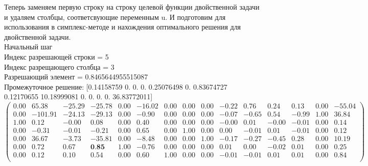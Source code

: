 \documentclass[draft]{article}
\begin{document}
\begin{flushleft}
Теперь заменяем первую строку на строку целевой функции двойственной задачи и удаляем столбцы, соответсвующие переменным u. И подготовим для использования в симплекс-методе и нахождения оптимального решения для двойственной задачи.\\

Начальный шаг\\
Индекс разрешающей строки = 5\\
Индекс разрещающего столбца = 3\\
Разрешающий элемент = 0.8465644955515087\\
Промежуточное решение:
[0.14158759  0.  0.  0.  0.25076498  0.  0.83674727  0.12170655  10.18999081  0.  0.  0.  0.  36.83772011]
\begin{equation*}
\begin{pmatrix}
    0.00 &   65.38 & -25.29 & -25.78 & 0.00 & -16.02 & 0.00 & 0.00 & 0.00 & -0.22 &  0.76 &  0.24 &  0.13 & 0.00 & -55.04 \\
    0.00 & -101.91 & -24.13 & -29.13 & 0.00 &  -0.90 & 0.00 & 0.00 & 0.00 & -0.07 & -0.65 &  0.54 & -0.99 & 1.00 &  36.84 \\
    1.00 &    0.12 &  -0.00 &   0.08 & 0.00 &   0.40 & 0.00 & 0.00 & 0.00 & -0.00 &  0.01 & -0.00 & -0.01 & 0.00 &   0.14 \\
    0.00 &   -0.31 &  -0.01 &  -0.21 & 0.00 &   0.65 & 0.00 & 1.00 & 0.00 &  0.00 & -0.01 &  0.01 & -0.01 & 0.00 &   0.12 \\
    0.00 &   36.67 &  -3.73 & -35.81 & 0.00 &  -8.48 & 0.00 & 0.00 & 1.00 & -0.17 & -0.27 & -0.45 &  0.28 & 0.00 &  10.19 \\
    0.00 &    0.72 &   0.67 &   \textbf{0.85} & 1.00 &  -0.76 & 0.00 & 0.00 & 0.00 &  0.01 &  0.00 & -0.02 &  0.01 & 0.00 &   0.25 \\
    0.00 &    0.12 &   0.10 &   0.54 & 0.00 &   0.60 & 1.00 & 0.00 & 0.00 & -0.01 & -0.01 &  0.01 &  0.01 & 0.00 &   0.84 \\
\end{pmatrix}
\end{equation*}
\end{flushleft}
\end{document}
